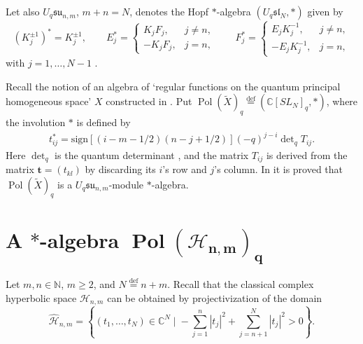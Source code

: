 \documentclass[11pt]{article}
\begin{document}
Let also $U_q\mathfrak{su}_{n,m}$, $m+n=N$, denotes the Hopf $*$-algebra $(U_q \mathfrak{sl}_N,*)$ given by
\[
(K_j^{\pm 1})^*=K_j^{\pm 1},\qquad E_j^*=
\begin{cases}
K_jF_j,& j \ne n,
\\ -K_jF_j,& j=n,
\end{cases}\qquad F_j^*=
\begin{cases}
E_jK_j^{-1},& j \ne n,
\\ -E_jK_j^{-1},& j=n,
\end{cases}
\]
with $j=1,\ldots,N-1$ \cite{RTF, polmat}.

Recall the notion of an algebra of `regular functions on the quantum principal homogeneous space' $X$
constructed in \cite{polmat}. Put $\operatorname{Pol}(\widetilde{X})_q\overset{\mathrm{def}}{=}
(\mathbb{C}[SL_N]_q,*)$, where the involution $*$ is def\/ined by
\begin{gather}\label{def_inv}
t_{ij}^*=\mathrm{sign}[(i-m-1/2)(n-j+1/2)](-q)^{j-i}\det\nolimits_qT_{ij}.
\end{gather}
Here $\det_q$ is the quantum determinant \cite{Ch-P}, and the matrix $T_{ij}$ is derived from the matrix
$\mathbf{t}=(t_{kl})$ by discarding its $i$'s row and $j$'s column. In \cite{polmat} it is proved that
$\operatorname{Pol}(\widetilde{X})_q$ is a $U_{q}\mathfrak{su}_{n,m}$-module $*$-algebra.

\section[A $*$-algebra $\operatorname{Pol}(\mathscr{H}_{n,m})_{q}$]{A $\boldsymbol{*}$-algebra $\boldsymbol{\operatorname{Pol}(\mathscr{H}_{n,m})_{q}}$}\label{sec_2}

Let $m,n\in\mathbb{N}$, $m\ge 2$, and $N\overset{\mathrm{def}}{=}n+m$. Recall that the classical complex
hyperbolic space $\mathscr{H}_{n,m}$ can be obtained by projectivization of the domain
\[
\widehat{\mathscr{H}}_{n,m}=\left\{(t_1,\ldots,t_N)\in\mathbb{C}^N\; \Big|\;
-\sum^n_{j=1}|t_j|^2+\sum^N_{j=n+1}|t_{j}|^2>0 \right\}.
\]
\end{document}
